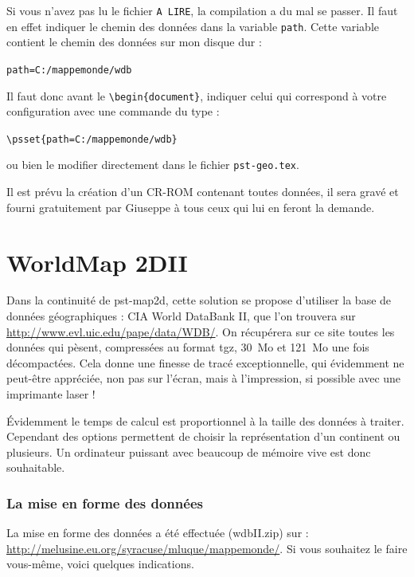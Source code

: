 \documentclass[11pt,french,BCOR10mm,DIV12,bibliography=totoc,parskip=false,
   smallheadings, headexclude,footexclude,oneside]{pst-doc}
\begin{document}
 Si vous
n'avez pas lu le fichier \verb+A LIRE+, la compilation a du mal se
passer. Il faut en effet indiquer le chemin des données dans la
variable \verb+path+. Cette variable contient le chemin des
données sur mon disque dur :

\verb+path=C:/mappemonde/wdb+

Il faut donc avant le \verb+\begin{document}+, indiquer celui qui
correspond à votre configuration avec une commande du type :

\verb+\psset{path=C:/mappemonde/wdb}+

 ou bien le modifier
directement dans le fichier \verb+pst-geo.tex+.

Il est prévu la création d'un CR-ROM contenant toutes données, il
sera gravé et fourni gratuitement par Giuseppe à tous ceux qui lui
en feront la demande.


\part{WorldMap 2DII}

Dans la continuité de \textsf{pst-map2d}, cette solution se propose
d'utiliser la base de données géographiques : \textsf{CIA World DataBank II}, que l'on trouvera sur
\url{http://www.evl.uic.edu/pape/data/WDB/}. On récupérera sur ce
site toutes les données qui pèsent, compressées au format
\textsf{tgz},  30~Mo et 121~Mo une fois décompactées. Cela donne
une finesse de tracé exceptionnelle, qui évidemment ne peut-être appréciée, non pas sur l'écran,
mais à l'impression, si possible avec une imprimante laser !

\'Evidemment le temps de calcul est proportionnel à la taille des
données à traiter. Cependant des options permettent de choisir la
représentation d'un continent ou plusieurs. Un ordinateur puissant
avec beaucoup de mémoire vive est donc souhaitable.
\begin{center}
\end{center}

\section{La mise en forme des données}
La mise en forme des données a été effectuée (\textsf{wdbII.zip}) sur :
\url{http://melusine.eu.org/syracuse/mluque/mappemonde/}. Si vous
souhaitez le faire vous-même, voici quelques indications.
\end{document}

